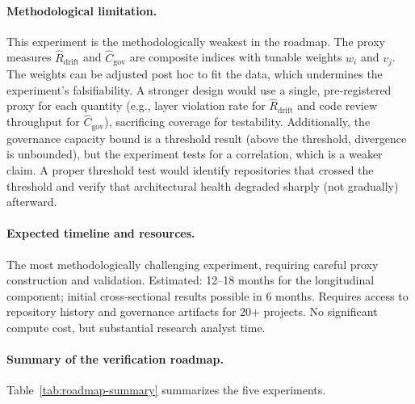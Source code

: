 \documentclass[11pt, a4paper, logo, copyright]{googledeepmind}
\begin{document}
\paragraph{Methodological limitation.} This experiment is the methodologically weakest in the roadmap. The proxy measures $\hat{R}_{\text{drift}}$ and $\hat{C}_{\text{gov}}$ are composite indices with tunable weights $w_i$ and $v_j$. The weights can be adjusted post hoc to fit the data, which undermines the experiment's falsifiability. A stronger design would use a single, pre-registered proxy for each quantity (e.g., layer violation rate for $\hat{R}_{\text{drift}}$ and code review throughput for $\hat{C}_{\text{gov}}$), sacrificing coverage for testability. Additionally, the governance capacity bound is a threshold result (above the threshold, divergence is unbounded), but the experiment tests for a correlation, which is a weaker claim. A proper threshold test would identify repositories that crossed the threshold and verify that architectural health degraded sharply (not gradually) afterward.

\paragraph{Expected timeline and resources.} The most methodologically challenging experiment, requiring careful proxy construction and validation. Estimated: 12--18 months for the longitudinal component; initial cross-sectional results possible in 6 months. Requires access to repository history and governance artifacts for 20+ projects. No significant compute cost, but substantial research analyst time.

\paragraph{Summary of the verification roadmap.} Table~\ref{tab:roadmap-summary} summarizes the five experiments.
\end{document}
